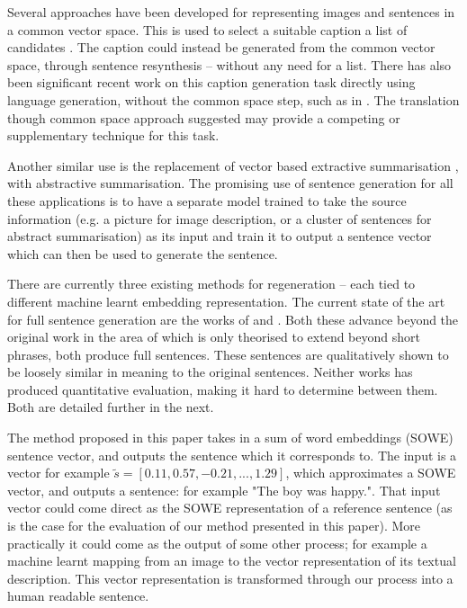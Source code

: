 \documentclass[11pt]{article}
\theoremstyle{plain}
\theoremstyle{definition}
\begin{document}
Several approaches have been developed for representing images and sentences in a common vector space. This is used to select a suitable caption a list of candidates \parencite{farhadi2010every,socherDTRNN}. The caption could instead be generated from the common vector space, through sentence resynthesis -- without any need for a list. There has also been significant recent work on this caption generation task directly using language generation, without the common space step, such as in \textcite{donahue2014long,Mao2014GenerateImageDesc}. The translation though common space approach suggested may provide a competing or supplementary technique for this task.

Another similar use is the replacement of vector based extractive summarisation \textcite{KaagebExtractiveSummaristation,yogatamaextractive}, with abstractive summarisation. The promising use of sentence generation for all these applications is to have a separate model trained to take the source information (e.g. a picture for image description, or a cluster of sentences for abstract summarisation) as its input and train it to output a sentence vector which can then be used to generate the sentence.

There are currently three existing methods for regeneration -- each tied to different machine learnt embedding representation. 
The current state of the art for full sentence generation are the works of \cite{iyyer2014generating} and \cite{Bowman2015SmoothGeneration}. 
Both these advance beyond the original work in the area of \cite{Dinu2014CompositionalGeneration} which is only theorised to extend beyond short phrases, both produce full sentences. These sentences are qualitatively shown to be loosely similar in meaning to the original sentences. Neither works has produced quantitative evaluation, making it hard to determine between them. Both are detailed further in the next.


The method proposed in this paper takes in a sum of word embeddings (SOWE) sentence vector, and outputs the sentence which it corresponds to. The input is a vector for example $\tilde{s}=[0.11, 0.57,-0.21,...,1.29]$, which approximates a SOWE vector, and outputs a sentence: for example "The boy was happy.". That input vector could come direct as the SOWE representation of a reference sentence (as is the case for the evaluation of our method presented in this paper). More practically it could come as the output of some other process; for example a machine learnt mapping from an image to the vector representation of its textual description. This vector representation is transformed through our process into a human readable sentence.
\end{document}
